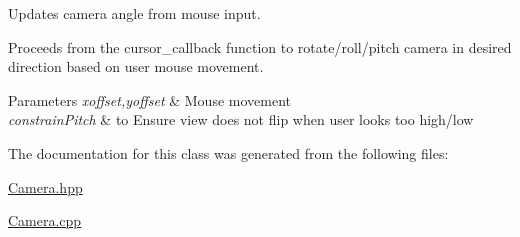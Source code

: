 Updates camera angle from mouse input. 

Proceeds from the cursor\+\_\+callback function to rotate/roll/pitch camera in desired direction based on user mouse movement. 
\begin{DoxyParams}{Parameters}
{\em xoffset,yoffset} & Mouse movement \\
\hline
{\em constrain\+Pitch} & to Ensure view does not flip when user looks too high/low \\
\hline
\end{DoxyParams}


The documentation for this class was generated from the following files\+:\begin{DoxyCompactItemize}
\item 
\hyperlink{_camera_8hpp}{Camera.\+hpp}\item 
\hyperlink{_camera_8cpp}{Camera.\+cpp}\end{DoxyCompactItemize}
